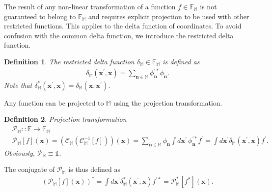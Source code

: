 \documentclass[12pt,aip,jmp,amssymb,amsmath]{revtex4-1}
\newtheorem{definition}{Definition}
\begin{document}
The result of any non-linear transformation of a function $f \in \mathbb{F}_{\mathbb{M}}$ is not guaranteed to belong to $\mathbb{F}_{\mathbb{M}}$ and requires explicit projection to be used with other restricted functions.
This applies to the delta function of coordinates.
To avoid confusion with the common delta function, we introduce the restricted delta function.

\begin{definition}
\label{def:func-calculus:restricted-delta}
    The restricted delta function $\delta_{\mathbb{M}} \in \mathbb{F}_{\mathbb{M}}$ is defined as
    \begin{equation*}\begin{split}
        \delta_{\mathbb{M}}(\boldsymbol{x}^\prime, \boldsymbol{x})
        = \sum_{\boldsymbol{n} \in \mathbb{M}} \phi_{\boldsymbol{n}}^{\prime*} \phi_{\boldsymbol{n}}.
    \end{split}\end{equation*}
    Note that $\delta_{\mathbb{M}}^*(\boldsymbol{x}^\prime, \boldsymbol{x}) = \delta_{\mathbb{M}}(\boldsymbol{x}, \boldsymbol{x}^\prime)$.
\end{definition}

Any function can be projected to $\mathbb{M}$ using the projection transformation.

\begin{definition}
\label{def:func-calculus:projector}
    Projection transformation
    \begin{equation*}\begin{split}
        & \mathcal{P}_{\mathbb{M}} ::
        \mathbb{F} \rightarrow \mathbb{F}_{\mathbb{M}} \\
        & \mathcal{P}_{\mathbb{M}}[f](\boldsymbol{x})
        = (\mathcal{C}_{\mathbb{M}}(\mathcal{C}_{\mathbb{M}}^{-1}[f])) (\boldsymbol{x})
        = \sum_{\boldsymbol{n} \in \mathbb{M}} \phi_{\boldsymbol{n}} \int
            d\boldsymbol{x}^\prime\, \phi_{\boldsymbol{n}}^{\prime*} f^\prime
        = \int d\boldsymbol{x}^\prime \delta_{\mathbb{M}}(\boldsymbol{x}^\prime, \boldsymbol{x}) f^\prime.
    \end{split}\end{equation*}
    Obviously, $\mathcal{P}_{\mathbb{B}} \equiv \mathds{1}$.
\end{definition}

The conjugate of $\mathcal{P}_{\mathbb{M}}$ is thus defined as
\begin{equation}\begin{split}
    (\mathcal{P}_{\mathbb{M}}[f](\boldsymbol{x}))^*
    = \int d\boldsymbol{x}^\prime \delta_{\mathbb{M}}^*(\boldsymbol{x}^\prime, \boldsymbol{x}) f^{\prime*}
    = \mathcal{P}_{\mathbb{M}}^* [f^*](\boldsymbol{x}).
\end{split}\end{equation}
\end{document}
